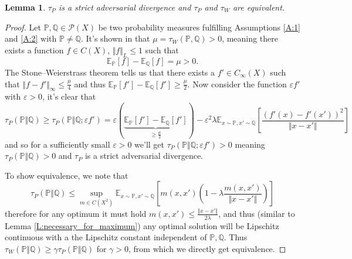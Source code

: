 \documentclass{article}
\newtheorem{lemma}{Lemma}
\begin{document}
 \begin{lemma}\label{L:equavent}
  $\tau_P$ is a strict adversarial divergence and $\tau_P$ and $\tau_W$ are equivalent.
 \end{lemma}

 \begin{proof}
  Let $\mathbb P,\mathbb Q\in\mathcal P(X)$ be two probability measures fulfilling Assumptions \ref{A:1} and \ref{A:2} with $\mathbb P\neq\mathbb Q$.
  It's shown in \cite{sriperumbudur2010hilbert} that $\mu=\tau_W(\mathbb P,\mathbb Q)>0$,
  meaning there exists a function $f\in C(X)$, $\Vert f\Vert_L \leq 1$ such that
 \[\mathbb E_{\mathbb P}[f]-\mathbb E_{\mathbb Q}[f]=\mu>0.\]
 The Stone–Weierstrass theorem tells us that there exists a $f'\in C_\infty(X)$ such that $\Vert f-f'\Vert_\infty\leq\frac\mu 4$
 and thus $\mathbb E_{\mathbb P}[f']-\mathbb E_{\mathbb Q}[f']\geq\frac{\mu}{2}$.
 Now consider the function $\varepsilon f'$ with $\varepsilon>0$, it's clear that
 \[\tau_P(\mathbb P\Vert\mathbb Q)\geq\tau_P(\mathbb P\Vert\mathbb Q;\varepsilon f')
 =\varepsilon(\underbrace{\mathbb E_{\mathbb P}[f']-\mathbb E_{\mathbb Q}[f']}_{\geq\frac{\mu}{2}})
 -\varepsilon^2\lambda\mathbb E_{x\sim \mathbb P,x'\sim\mathbb Q}[\frac{(f'(x)-f'(x'))^2}{\Vert x-x'\Vert}]\]
 and so for a sufficiently small $\varepsilon>0$ we'll get $\tau_P(\mathbb P\Vert\mathbb Q;\varepsilon f')>0$
 meaning $\tau_P(\mathbb P\Vert\mathbb Q)>0$ and $\tau_P$ is a strict adversarial divergence.

 To show equivalence, we note that
 \[\tau_P(\mathbb P\Vert\mathbb Q)\leq\sup_{m\in C(X^2)}\mathbb E_{x\sim\mathbb P,x'\sim\mathbb Q}\left[m(x,x')\left(1-\lambda\frac{m(x,x')}{\Vert x-x'\Vert}\right)\right]\]
 therefore for any optimum it must hold $m(x,x')\leq \frac{\Vert x-x'\Vert}{2\lambda}$, and thus (similar to Lemma \ref{L:necessary_for_maximum}) any optimal solution will
 be Lipschitz continuous with a the Lipschitz constant independent of $\mathbb P,\mathbb Q$. Thus $\tau_W(\mathbb P\Vert\mathbb Q)\geq \gamma\tau_P(\mathbb P\Vert\mathbb Q)$ for
 $\gamma>0$, from which we directly get equivalence.
 \end{proof}
\end{document}
